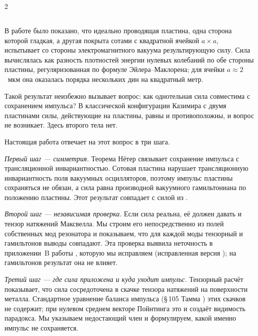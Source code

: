 \documentclass[twoside, 10pt]{article}
\def\myvspacebeforesubsection{-2.0mm}
\def\myvspaceaftersubsection{-2.5mm}
\begin{document}
\vspace{5mm}

\newpage

\begin{multicols}{2}

\vspace{\myvspacebeforesubsection}
\subsection*{}
\vspace{\myvspaceaftersubsection}


В работе \cite{Drozdov2024} было показано, что идеально проводящая пластина, одна сторона
которой гладкая, а другая покрыта сотами с квадратной ячейкой \(a\times a\), испытывает со
стороны электромагнитного вакуума результирующую силу. Сила вычислялась как разность плотностей
энергии нулевых колебаний по обе стороны пластины, регуляризованная по формуле
Эйлера--Маклорена; для ячейки \(a\approx2\)~мкм она оказалась порядка нескольких дин на
квадратный метр.

Такой результат неизбежно вызывает вопрос: как однотельная сила совместима с сохранением
импульса? В классической конфигурации Казимира с двумя пластинами силы, действующие на пластины,
равны и противоположны, и вопрос не возникает. Здесь второго тела нет.

Настоящая работа отвечает на этот вопрос в три шага.

\textit{Первый шаг --- симметрия.} Теорема Нётер \cite{Noether1918} связывает сохранение
импульса с трансляционной инвариантностью. Сотовая пластина нарушает
трансляционную инвариантность поля вакуумных осцилляторов, поэтому
импульс пластины сохраняться не обязан, а сила равна производной вакуумного гамильтониана по
положению пластины. Этот результат совпадает с силой из \cite{Drozdov2024}.

\textit{Второй шаг --- независимая проверка.} Если сила реальна, её должен давать и тензор
натяжений Максвелла. Мы строим его непосредственно из полей собственных мод резонатора и
показываем, что для каждой моды тензорный и гамильтонов выводы совпадают. Эта проверка выявила
неточность в приложении~B работы \cite{Drozdov2024}, которую мы исправляем (исправленная версия \cite{Drozdov2024fix}); на гамильтонов результат
она не влияет.

\textit{Третий шаг --- где сила приложена и куда уходит импульс.} Тензорный расчёт показывает, что
сила сосредоточена в скачке тензора натяжений на поверхности металла. Стандартное уравнение
баланса импульса (\S\,105 Тамма \cite{Tamm1957}) этих скачков не содержит; при нулевом среднем
векторе Пойнтинга это и создаёт видимость парадокса. Мы указываем недостающий член и
формулируем, какой именно импульс не сохраняется.


\end{multicols}
\end{document}
